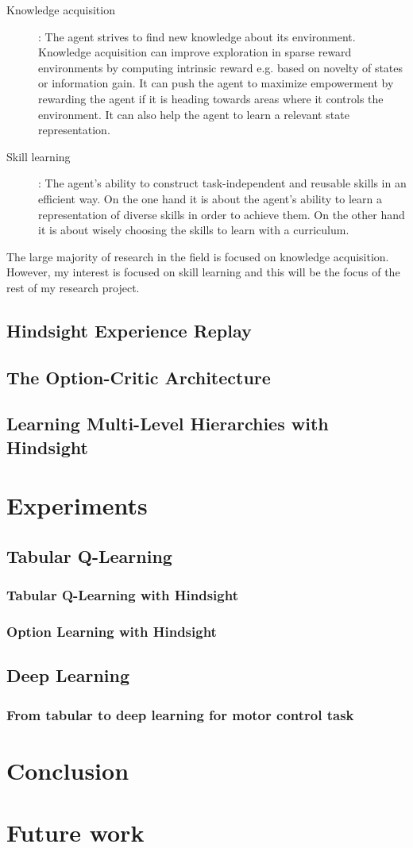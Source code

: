 \documentclass[conference]{IEEEtran}
\begin{document}
\begin{description}
\item[Knowledge acquisition] : The agent strives to find new knowledge about its environment. Knowledge acquisition can improve exploration in sparse reward environments by computing intrinsic reward e.g. based on novelty of states or information gain. It can push the agent to maximize empowerment by rewarding the agent if it is heading towards areas where it controls the environment. It can also help the agent to learn a relevant state representation.
\item[Skill learning] : The agent's ability to construct task-independent and reusable skills in an efficient way. On the one hand it is about the agent's ability to learn a representation of diverse skills in order to achieve them. On the other hand it is about wisely choosing the skills to learn with a curriculum.
\end{description}
The large majority of research in the field is focused on knowledge acquisition. However, my interest is focused on skill learning and this will be the focus of the rest of my research project.
\subsection{Hindsight Experience Replay}
\subsection{The Option-Critic Architecture}
\subsection{Learning Multi-Level Hierarchies with Hindsight}
\section{Experiments} \label{sec:experiments}
\subsection{Tabular Q-Learning}
\subsubsection{Tabular Q-Learning with Hindsight}
\subsubsection{Option Learning with Hindsight}
\subsection{Deep Learning}
\subsubsection{From tabular to deep learning for motor control task}
\section{Conclusion} \label{sec:conclusion}
\section{Future work} \label{sec:future_work}
\newpage
\printbibliography
\end{document}
